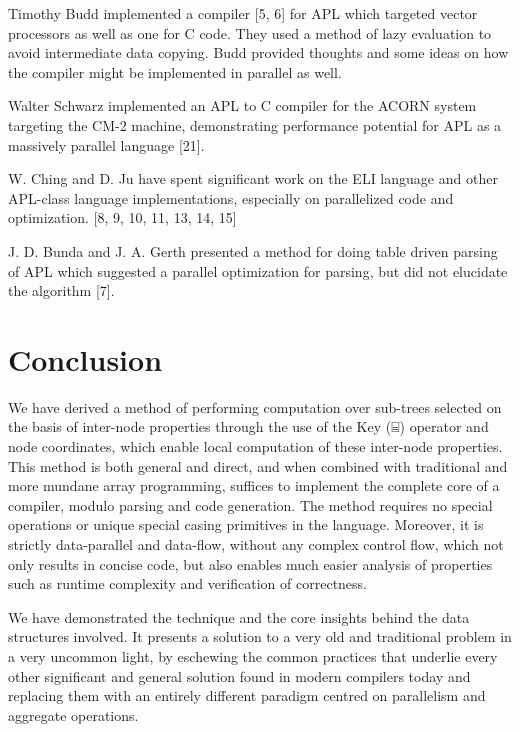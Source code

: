 \documentclass[pldi]{sigplanconf-pldi15}
\begin{document}
Timothy Budd implemented a compiler [5, 6] for APL which targeted vector processors as well as one 
for C code. They used a method of lazy evaluation to avoid intermediate data copying. Budd provided 
thoughts and some ideas on how the compiler might be implemented in parallel as well. 

Walter Schwarz implemented an APL to C compiler for the ACORN system targeting the CM-2 machine, 
demonstrating performance potential for APL as a massively parallel language [21].

W. Ching and D. Ju have spent significant work on the ELI language and other APL-class language
 implementations, especially on parallelized code and optimization. [8, 9, 10, 11, 13, 14, 15]

J. D. Bunda and J. A. Gerth presented a method for doing table driven parsing of APL which 
suggested a parallel optimization for parsing, but did not elucidate the algorithm [7].
\section{Conclusion}

We have derived a method of performing computation over sub-trees selected on the basis of 
inter-node properties through the use of the Key (⌸) operator and node coordinates, which enable 
local computation of these inter-node properties. This method is both general and direct, and when 
combined with traditional and more mundane array programming, suffices to implement the 
complete core of a compiler, modulo parsing and code generation. The method requires no special 
operations or unique special casing primitives in the language. Moreover, it is strictly data-parallel 
and data-flow, without any complex control flow, which not only results in concise code, but also 
enables much easier analysis of properties such as runtime complexity and verification of correctness. 

We have demonstrated the technique and the core insights behind the data structures involved. It 
presents a solution to a very old and traditional problem in a very uncommon light, by eschewing 
the common practices that underlie every other significant and general solution found in modern 
compilers today and replacing them with an entirely different paradigm centred on parallelism 
and aggregate operations.

\end{document}
